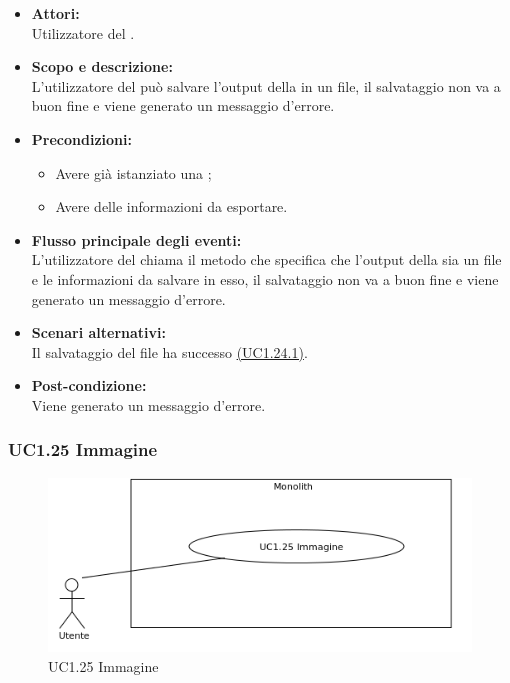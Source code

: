 \begin{itemize}
	\item \textbf{Attori:}
	\\Utilizzatore del .
	\item \textbf{Scopo e descrizione:} 
	\\L'utilizzatore del  può salvare l'output della  in un file, il salvataggio non va a buon fine e viene generato un messaggio d'errore.
	\item \textbf{Precondizioni:}
	\begin{itemize}
		\item Avere già istanziato una ;
		\item Avere delle informazioni da esportare.
	\end{itemize}
	\item \textbf{Flusso principale degli eventi:}
	\\L'utilizzatore del  chiama il metodo che specifica che l'output della  sia un file e le informazioni da salvare in esso, il salvataggio non va a buon fine e viene generato un messaggio d'errore.
	\item \textbf{Scenari alternativi:}
	\\Il salvataggio del file ha successo \hyperref[UC1.24.1]{(UC1.24.1)}.
	\item \textbf{Post-condizione:}
	\\Viene generato un messaggio d'errore.
\end{itemize}

\subsubsection{UC1.25 Immagine} \label{UC1.25}

\begin{figure}[H]
	\centering
	\includegraphics[width=15cm]{../../documenti/AnalisiDeiRequisiti/Diagrammi_img/uc1_25.png}
	\caption{UC1.25 Immagine}
\end{figure}

